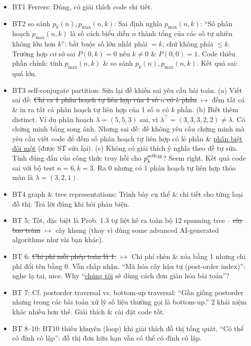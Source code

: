 \documentclass{article}
\begin{document}
\begin{enumerate}
\begin{itemize}
        \begin{itemize}
            \item BT1 Ferrers: Đúng, có giải thích code chi tiết. 
            \item BT2 so sánh $p_k(n),p_{\max}(n,k)$: Sai định nghĩa $p_{\max}(n,k)$: ``Số phân hoạch $p_{\max}(n,k)$ là số cách biểu diễn $n$ thành tổng của các số tự nhiên không lớn hơn $k$'': bắt buộc số lớn nhất phải $= k$, chứ không phải $\le k$. Trường hợp cơ sở sai $P(0,k) = 0$ nếu $k\ne0$ \& $P(0,0) = 1$. Code thiếu phần chính: tính $p_{\max}(n,k)$ \& so sánh $p_k(n),p_{\max}(n,k)$. Kết quả sai: quá lớn.
            \item BT3 self-conjugate partition: Sửa lại đề khiến sai yêu cầu bài toán. (a) Viết sai đề: \st{Chỉ ra 1 phân hoạch tự liên hợp của 1 số $n$ có $k$ phần} $\mapsto$ đếm tất cả \& in ra tất cả phân hoạch tự liên hợp của 1 số $n$ có $k$ phần. (b) Biết thêm distinct. Ví dụ phân hoạch $\lambda = (5,5,3)$ sai, vì $\lambda^\top = (3,3,3,2,2)\ne\lambda$. Có chứng minh bằng song ánh. Nhưng sai đề: đề không yêu cầu chứng minh mà yêu cầu viết code để đếm số phân hoạch tự liên hợp có lẻ phần \& \underline{phân biệt đôi một} (được ST sửa lại). (c) Không có giải thích ý nghĩa theo đề tự sửa. Tính đúng đắn của công thức truy hồi cho $p_k^{\rm selfcjg}$? Seem right. Kết quả code sai với bộ test $n = 6,k = 3$. Ra 0 nhưng có 1 phân hoạch tự liên hợp thỏa mãn là $\lambda = (3,2,1)$.
            \item BT4 graph \& tree representations: Trình bày cụ thể \& chi tiết cho từng loại đồ thị. Trả lời đúng khi hỏi phản biện.
            \item BT 5: Tốt, đặc biệt là Prob. 1.3 tự liệt kê ra toàn bộ 12 spanning tree -- \st{cây bao trùm} $\mapsto$ cây khung (thay  vì dùng some advanced AI-generated algorithms như vài bạn khác).
            \item BT 6: \st{Chi phí mỗi phép toán là 1.} $\mapsto$ Chi phí chèn \& xóa bằng 1 nhưng chi phí đổi tên bằng 0. Vẫn chấp nhận. ``Mã hóa cây hậu tự (post-order index)'': nghe lạ tai, nice. Why ``\underline{chúng tôi} sẽ dùng cách đơn giản hóa bài toán''?
            \item BT 7: Cf. postorder traversal vs. bottom-up traversal: ``Gần giống postorder nhưng trong các bài toán xử lý số liệu thường gọi là bottom-up.'' 2 khái niệm khác nhiều hơn thế. Giải thích \& cài đặt code tốt.
            \item BT 8--10: BT10 thiếu khuyên (loop) khi giải thích đồ thị tổng quát, ``Có thể có đỉnh cô lập'': đồ thị đơn hữu hạn vẫn có thể có đỉnh cô lập.

\end{itemize}
\end{itemize}
\end{enumerate}
\end{document}
